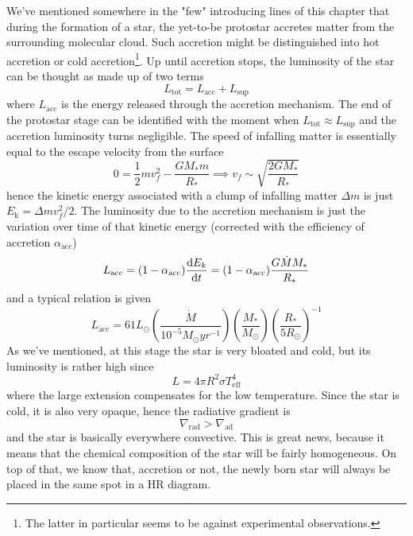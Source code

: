 We've mentioned somewhere in the "few" introducing lines of this chapter that during the formation of a star, the yet-to-be protostar accretes matter from the surrounding molecular cloud. Such accretion might be distinguished into hot accretion or cold accretion\footnote{The latter in particular seems to be against experimental observations.}. Up until accretion stops, the luminosity of the star can be thought as made up of two terms
\begin{equation*}
    L_{\text{tot}} = L_{\text{acc}}+L_{\text{sup}}
\end{equation*}
where $L_{\text{acc}}$ is the energy released through the accretion mechanism. The end of the protostar stage can be identified with the moment when $L_{\text{tot}} \approx L_{\text{sup}}$ and the accretion luminosity turns negligible. The speed of infalling matter is essentially equal to the escape velocity from the surface
\begin{equation*}
    0 = \frac{1}{2}mv_{f}^{2}-\frac{GM_{*}m}{R_{*}} \implies v_{f}\sim\sqrt{\frac{2GM_{*}}{R_{*}}}
\end{equation*}
hence the kinetic energy associated with a clump of infalling matter $\Delta m$ is just $E_{\text{k}} = \Delta m v_{f}^{2}/2$. The luminosity due to the accretion mechanism is just the variation over time of that kinetic energy (corrected with the efficiency of accretion $\alpha_{\text{acc}}$)
\begin{equation*}
    L_{\text{acc}} = (1-\alpha_{\text{acc}})\frac{\text{d}E_{k}}{\text{d}t} = (1-\alpha_{\text{acc}})\frac{G\dot{M}M_{*}}{R_{*}}
\end{equation*}
and a typical relation is given
\begin{equation*}
    L_{\text{acc}} = 61L_{\odot}\left(\frac{\dot{M}}{10^{-5}M_{\odot}\unit{yr}^{-1}}\right)\left(\frac{M_{*}}{M_{\odot}}\right)\left(\frac{R_{*}}{5R_{\odot}}\right)^{-1}
\end{equation*}
As we've mentioned, at this stage the star is very bloated and cold, but its luminosity is rather high since 
\begin{equation*}
    L = 4\pi R^{2}\sigma T_{\text{eff}}^{4}
\end{equation*}
where the large extension compensates for the low temperature. Since the star is cold, it is also very opaque, hence the radiative gradient is 
\begin{equation*}
    \nabla_{\text{rad}} > \nabla_{\text{ad}}
\end{equation*}
and the star is basically everywhere convective. This is great news, because it means that the chemical composition of the star will be fairly homogeneous. On top of that, we know that, accretion or not, the newly born star will always be placed in the same spot in a HR diagram.

